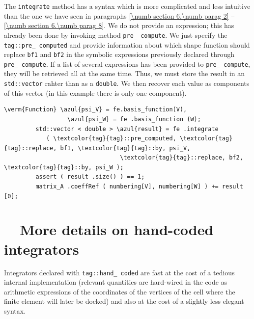 The {\small\tt integrate} method has a syntax which is more complicated and less intuitive
than the one we have seen in paragraphs \ref{\numb section 6.\numb parag 2} --
\ref{\numb section 6.\numb parag 8}.
We do not provide an expression; this has already been done by invoking method
{\small\tt pre\_\,compute}.
We just specify the {\small\tt\textcolor{tag}{tag}::pre\_\,computed} and provide
information about which shape function should replace {\small\tt bf1} and {\small\tt bf2}
in the symbolic expressions previously declared through {\small\tt pre\_\,compute}.
If a list of several expressions has been provided to {\small\tt pre\_\,compute},
they will be retrieved all at the same time.
Thus, we must store the result in an {\small\tt std::vector} rahter than as a {\small\tt double}.
We then recover each value as components of this vector (in this example there is only
one component).

\begin{Verbatim}[commandchars=\\\{\},formatcom=\small\tt,frame=single,
   label=parag-\ref{\numb section 6.\numb parag 9}.cpp,rulecolor=\color{coment},
   baselinestretch=0.94,framesep=2mm                                            ]
         \verm{Function} \azul{psi_V} = fe.basis_function(V),
                  \azul{psi_W} = fe .basis_function (W);
         std::vector < double > \azul{result} = fe .integrate 
            ( \textcolor{tag}{tag}::pre_computed, \textcolor{tag}{tag}::replace, bf1, \textcolor{tag}{tag}::by, psi_V,
                                 \textcolor{tag}{tag}::replace, bf2, \textcolor{tag}{tag}::by, psi_W );
         assert ( result .size() ) == 1;
         matrix_A .coeffRef ( numbering[V], numbering[W] ) += result [0];
\end{Verbatim}

\section{~~More details on hand-coded integrators}\label{\numb section 6.\numb parag 10}

Integrators declared with {\small\tt\textcolor{tag}{tag}::hand\_\,coded} are fast at the
cost of a tedious internal implementation (relevant quantities are hard-wired in the code
as arithmetic expressions of the coordinates of the vertices of the cell where the
finite element will later be docked) and also at the cost of a slightly less elegant syntax.

